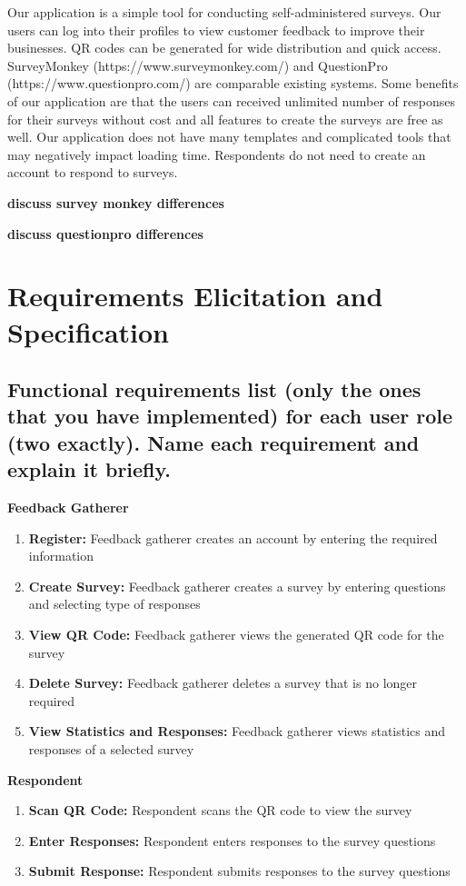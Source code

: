 \documentclass[letterpaper, 12 pt, conference]{ieeeconf}
\begin{document}
Our application is a simple tool for conducting self-administered surveys. Our users can log into their profiles to view customer feedback to improve their businesses. QR codes can be generated for wide distribution and quick access. SurveyMonkey (https://www.surveymonkey.com/) and QuestionPro (https://www.questionpro.com/) are comparable existing systems. Some benefits of our application are that the users can received unlimited number of responses for their surveys without cost and all features to create the surveys are free as well. Our application does not have many templates and complicated tools that may negatively impact loading time. Respondents do not need to create an account to respond to surveys. 

\textbf{discuss survey monkey differences}

\textbf{discuss questionpro differences}


\newpage
\section{Requirements Elicitation and Specification}
\subsection{Functional requirements list (only the ones that you have implemented) for each user role (two exactly). Name each requirement and explain it briefly.}

\textbf{Feedback Gatherer}
\begin{enumerate}
   \item \textbf{Register:} Feedback gatherer creates an account by entering the required information
   \item \textbf{Create Survey:} Feedback gatherer creates a survey by entering questions and selecting type of responses
   \item \textbf{View QR Code:} Feedback gatherer views the generated QR code for the survey
   \item \textbf{Delete Survey:} Feedback gatherer deletes a survey that is no longer required
   \item \textbf{View Statistics and Responses:} Feedback gatherer views statistics and responses of a selected survey
\end{enumerate}

\textbf{Respondent}
\begin{enumerate}
   \item \textbf{Scan QR Code:} Respondent scans the QR code to view the survey
   \item \textbf{Enter Responses:} Respondent enters responses to the survey questions
   \item \textbf{Submit Response:} Respondent submits responses to the survey questions
\end{enumerate}
\end{document}
